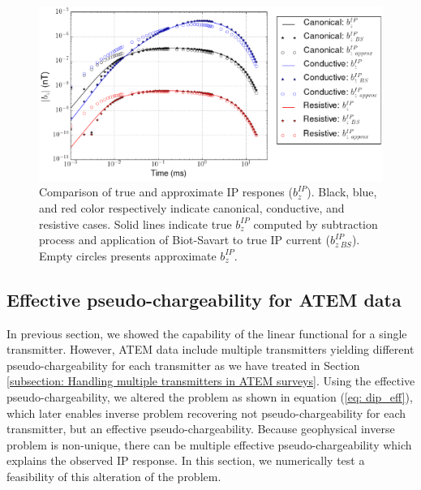 \documentclass[a4paper, 11pt]{article}
\begin{document}
\begin{figure}[htb]
  \centering
  \includegraphics[width=1\textwidth]{figures/True_vs_approx_IPresp.png}
  \caption{Comparison of true and approximate IP respones ($b_z^{IP}$). Black, blue, and red color respectively indicate canonical, conductive, and resistive cases. Solid lines indicate true $b_z^{IP}$ computed by subtraction process and application of Biot-Savart to true IP current ($b_{z \ BS}^{IP}$). Empty circles presents approximate $b_z^{IP}$. }
  \label{F:True_vs_approx_IPresp}
\end{figure}
\clearpage

\subsection{Effective pseudo-chargeability for ATEM data}
In previous section, we showed the capability of the linear functional for a single transmitter. 
However, ATEM data include multiple transmitters yielding different pseudo-chargeability for each transmitter as we have treated in Section \ref{subsection: Handling multiple transmitters in ATEM surveys}. 
Using the effective pseudo-chargeability, we altered the problem as shown in equation (\ref{eq: dip_eff}), which later enables inverse problem recovering not pseudo-chargeability for each transmitter, but an effective pseudo-chargeability. 
Because geophysical inverse problem is non-unique, there can be multiple effective pseudo-chargeability which explains the observed IP response. 
In this section, we numerically test a feasibility of this alteration of the problem. 
\end{document}

